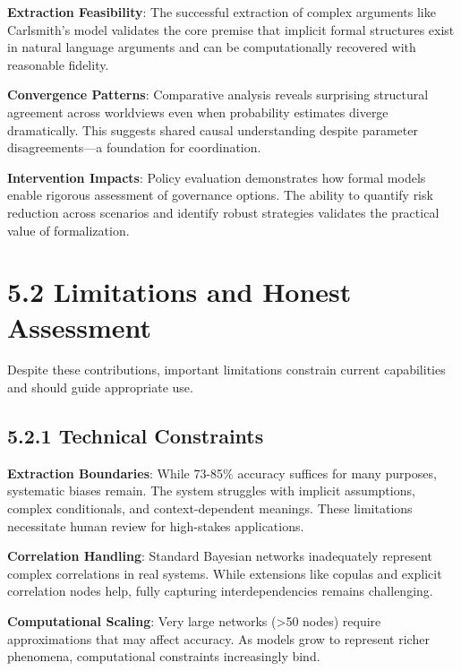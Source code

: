 \documentclass[
  11pt,
  letterpaper,
]{book}
\begin{document}
\textbf{Extraction Feasibility}: The successful extraction of complex
arguments like Carlsmith's model validates the core premise that
implicit formal structures exist in natural language arguments and can
be computationally recovered with reasonable fidelity.

\textbf{Convergence Patterns}: Comparative analysis reveals surprising
structural agreement across worldviews even when probability estimates
diverge dramatically. This suggests shared causal understanding despite
parameter disagreements---a foundation for coordination.

\textbf{Intervention Impacts}: Policy evaluation demonstrates how formal
models enable rigorous assessment of governance options. The ability to
quantify risk reduction across scenarios and identify robust strategies
validates the practical value of formalization.

\section*{5.2 Limitations and Honest
Assessment}\label{sec-limitations-assessment}


Despite these contributions, important limitations constrain current
capabilities and should guide appropriate use.

\subsection*{5.2.1 Technical
Constraints}\label{sec-technical-constraints}

\textbf{Extraction Boundaries}: While 73-85\% accuracy suffices for many
purposes, systematic biases remain. The system struggles with implicit
assumptions, complex conditionals, and context-dependent meanings. These
limitations necessitate human review for high-stakes applications.

\textbf{Correlation Handling}: Standard Bayesian networks inadequately
represent complex correlations in real systems. While extensions like
copulas and explicit correlation nodes help, fully capturing
interdependencies remains challenging.

\textbf{Computational Scaling}: Very large networks (\textgreater50
nodes) require approximations that may affect accuracy. As models grow
to represent richer phenomena, computational constraints increasingly
bind.
\end{document}
